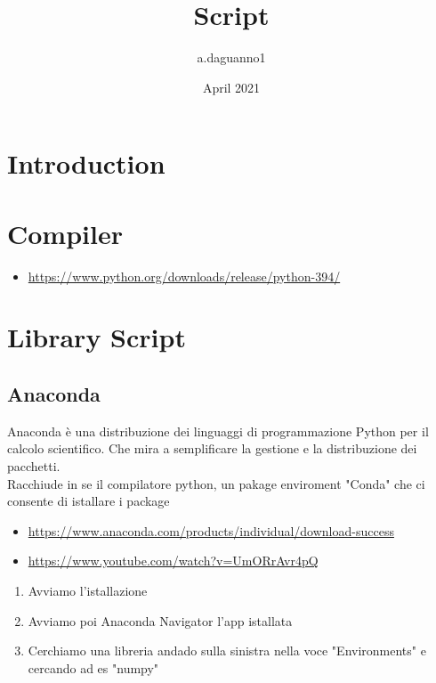 \documentclass{article}
\title{Script}
\author{a.daguanno1 }
\date{April 2021}
\begin{document}
\maketitle

\section{Introduction}
\section{Compiler}
\begin{itemize}
    \item\url{https://www.python.org/downloads/release/python-394/}
\end{itemize}
\section{Library Script}
\subsection{Anaconda}
Anaconda è una distribuzione dei linguaggi di programmazione Python per il calcolo scientifico. Che mira a semplificare la gestione e la distribuzione dei pacchetti.
\\Racchiude in se il compilatore python, un pakage enviroment "Conda" che ci consente di istallare i package 
\begin{itemize}
    \item\url{https://www.anaconda.com/products/individual/download-success}
    \item\url{https://www.youtube.com/watch?v=UmORrAvr4pQ}
\end{itemize}
\begin{enumerate}
    \item Avviamo l'istallazione
    \item Avviamo poi Anaconda Navigator l'app istallata
    \item Cerchiamo una libreria andado sulla sinistra nella voce "Environments" e cercando ad es "numpy"
\end{enumerate}
\end{document}
